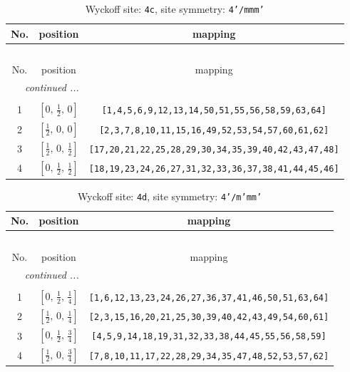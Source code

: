 \documentclass[fleqn,8pt]{jsarticle}
\begin{document}
\renewcommand{\arraystretch}{1.2}
\begin{longtable}{ccc}
\caption{Wyckoff site: {\tt 4c}, site symmetry: {\tt 4'/mmm'}}
 \\
 \hline \hline
No. & position & mapping \\ \hline \endfirsthead

\multicolumn{2}{l}{\tablename\ \thetable{}} \\
 \hline \hline
No. & position & mapping \\ \hline \endhead

 \hline \hline
\multicolumn{2}{r}{\footnotesize\it continued ...} \\ \endfoot

 \hline \hline
\multicolumn{2}{r}{} \\ \endlastfoot

1 & $\left[ 0,\, \frac{1}{2},\, 0 \right]$ & {\tt [1,4,5,6,9,12,13,14,50,51,55,56,58,59,63,64]} \\ \hline
2 & $\left[ \frac{1}{2},\, 0,\, 0 \right]$ & {\tt [2,3,7,8,10,11,15,16,49,52,53,54,57,60,61,62]} \\ \hline
3 & $\left[ \frac{1}{2},\, 0,\, \frac{1}{2} \right]$ & {\tt [17,20,21,22,25,28,29,30,34,35,39,40,42,43,47,48]} \\ \hline
4 & $\left[ 0,\, \frac{1}{2},\, \frac{1}{2} \right]$ & {\tt [18,19,23,24,26,27,31,32,33,36,37,38,41,44,45,46]} \\
\end{longtable}
\renewcommand{\arraystretch}{1.2}
\begin{longtable}{ccc}
\caption{Wyckoff site: {\tt 4d}, site symmetry: {\tt 4'/m'mm'}}
 \\
 \hline \hline
No. & position & mapping \\ \hline \endfirsthead

\multicolumn{2}{l}{\tablename\ \thetable{}} \\
 \hline \hline
No. & position & mapping \\ \hline \endhead

 \hline \hline
\multicolumn{2}{r}{\footnotesize\it continued ...} \\ \endfoot

 \hline \hline
\multicolumn{2}{r}{} \\ \endlastfoot

1 & $\left[ 0,\, \frac{1}{2},\, \frac{1}{4} \right]$ & {\tt [1,6,12,13,23,24,26,27,36,37,41,46,50,51,63,64]} \\ \hline
2 & $\left[ \frac{1}{2},\, 0,\, \frac{1}{4} \right]$ & {\tt [2,3,15,16,20,21,25,30,39,40,42,43,49,54,60,61]} \\ \hline
3 & $\left[ 0,\, \frac{1}{2},\, \frac{3}{4} \right]$ & {\tt [4,5,9,14,18,19,31,32,33,38,44,45,55,56,58,59]} \\ \hline
4 & $\left[ \frac{1}{2},\, 0,\, \frac{3}{4} \right]$ & {\tt [7,8,10,11,17,22,28,29,34,35,47,48,52,53,57,62]} \\
\end{longtable}
\end{document}

